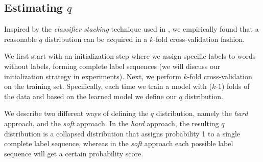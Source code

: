 \subsection{Estimating $q$}
\label{sec:approach}

Inspired by the {\em classifier stacking} technique used in \citet{nivre2008integrating}, we empirically found that a reasonable $q$ distribution can be acquired in a $k$-fold cross-validation fashion.

We first start with an initialization step where we assign specific labels to words without labels, forming complete label sequences (we will discuss our initialization strategy in experiments). 
Next, we perform $k$-fold cross-validation on the training set. 
Specifically, each time we train a model with ($k$-$1$) folds of the data and based on the learned model we define our $q$ distribution.

We describe two different ways of defining the $q$ distribution, namely the {\em hard} approach, and the {\em soft} approach.
In the {\em hard} approach, the resulting $q$ distribution is a collapsed distribution that assigns probability 1 to a single complete label sequence, whereas in the {\em soft} approach each possible label sequence will get a certain probability score.

